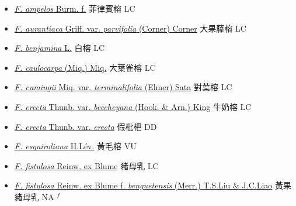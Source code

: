 \begin{itemize}
  \begin{itemize}
        \item[] \href{http://www.theplantlist.org/tpl1.1/search?q=Ficus+ampelos}{\textit{F. ampelos} Burm. f.}   菲律賓榕 LC
        \item[] \href{http://www.theplantlist.org/tpl1.1/search?q=Ficus+aurantiaca+var.+parvifolia}{\textit{F. aurantiaca} Griff. var. \textit{parvifolia} (Corner) Corner}   大果藤榕 LC
        \item[] \href{http://www.theplantlist.org/tpl1.1/search?q=Ficus+benjamina}{\textit{F. benjamina} L.}   白榕 LC
        \item[] \href{http://www.theplantlist.org/tpl1.1/search?q=Ficus+caulocarpa}{\textit{F. caulocarpa} (Miq.) Miq.}   大葉雀榕 LC
        \item[] \href{http://www.theplantlist.org/tpl1.1/search?q=Ficus+cumingii+var.+terminalifolia}{\textit{F. cumingii} Miq. var. \textit{terminalifolia} (Elmer) Sata}   對葉榕 LC
        \item[] \href{http://www.theplantlist.org/tpl1.1/search?q=Ficus+erecta+var.+beecheyana}{\textit{F. erecta} Thunb. var. \textit{beecheyana} (Hook. \& Arn.) King}   牛奶榕 LC
        \item[] \href{http://www.theplantlist.org/tpl1.1/search?q=Ficus+erecta+var.+erecta}{\textit{F. erecta} Thunb. var. \textit{erecta}}   假枇杷 DD
        \item[] \href{http://www.theplantlist.org/tpl1.1/search?q=Ficus+esquiroliana}{\textit{F. esquiroliana} H.Lév.}   黃毛榕 VU
        \item[] \href{http://www.theplantlist.org/tpl1.1/search?q=Ficus+fistulosa}{\textit{F. fistulosa} Reinw. ex Blume}   豬母乳 LC
        \item[] \href{http://www.theplantlist.org/tpl1.1/search?q=Ficus+fistulosa+ f. +benguetensis}{\textit{F. fistulosa} Reinw. ex Blume  f.  \textit{benguetensis} (Merr.) T.S.Liu \& J.C.Liao}   黃果豬母乳 NA $^f$

\end{itemize}
\end{itemize}
